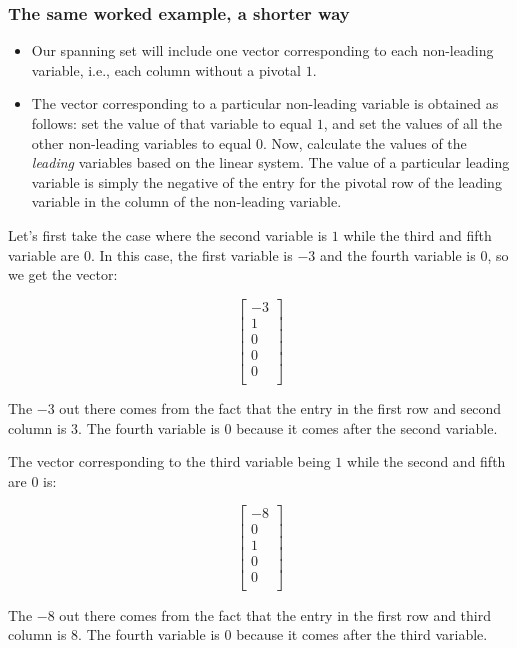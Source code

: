 \documentclass[10pt]{amsart}
\begin{document}
\subsubsection{The same worked example, a shorter way}

\begin{itemize}
\item Our spanning set will include one vector corresponding to each
  non-leading variable, i.e., each column without a pivotal $1$.
\item The vector corresponding to a particular non-leading variable is
  obtained as follows: set the value of that variable to equal $1$,
  and set the values of all the other non-leading variables to equal
  $0$. Now, calculate the values of the {\em leading} variables based
  on the linear system. The value of a particular leading variable is
  simply the negative of the entry for the pivotal row of the leading
  variable in the column of the non-leading variable.
\end{itemize}

Let's first take the case where the second variable is $1$ while the
third and fifth variable are $0$. In this case, the first variable is
$-3$ and the fourth variable is $0$, so we get the vector:

$$\left[\begin{matrix} -3 \\ 1 \\ 0 \\ 0 \\ 0 \\\end{matrix}\right]$$

The $-3$ out there comes from the fact that the entry in the first row
and second column is $3$. The fourth variable is $0$ because it comes
after the second variable.

The vector corresponding to the third variable being $1$ while the
second and fifth are $0$ is:

$$\left[\begin{matrix} -8 \\ 0 \\ 1 \\ 0 \\ 0 \\\end{matrix}\right]$$

The $-8$ out there comes from the fact that the entry in the first row
and third column is $8$. The fourth variable is $0$ because it comes
after the third variable.
\end{document}
